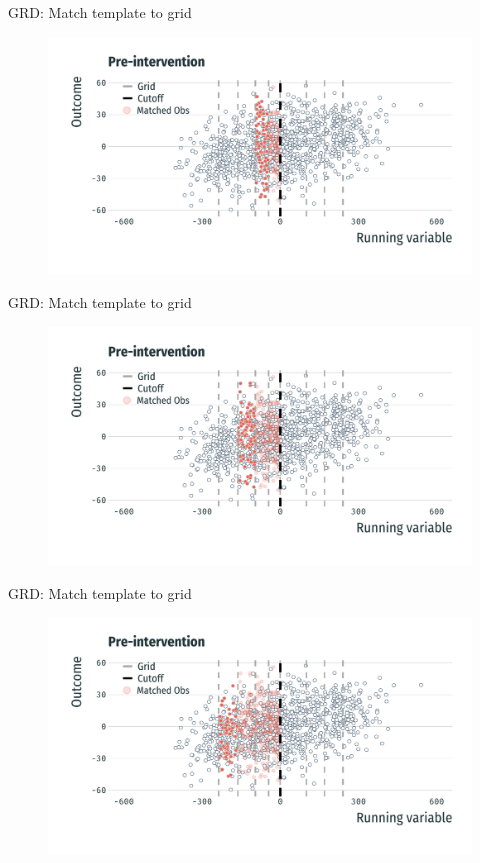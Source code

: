 \documentclass[usenames,dvipsnames,11pt,aspectratio=169]{beamer}
\begin{document}
\begin{frame}{GRD: Match template to grid}
\begin{figure}[!htb]
\centering
   \includegraphics[width=\textwidth]{figures/pre3.pdf}
\end{figure}
\end{frame}

\begin{frame}{GRD: Match template to grid}
\begin{figure}[!htb]
\centering
   \includegraphics[width=\textwidth]{figures/pre4.pdf}
\end{figure}
\end{frame}

\begin{frame}{GRD: Match template to grid}
\begin{figure}[!htb]
\centering
   \includegraphics[width=\textwidth]{figures/pre5.pdf}
\end{figure}
\end{frame}
\end{document}
